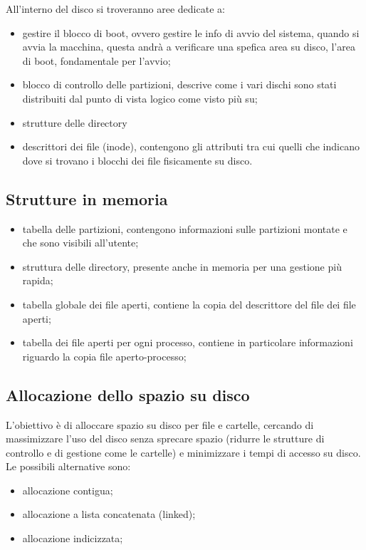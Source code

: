 \documentclass[a4paper, 12pt]{book}
\begin{document}
All'interno del disco si troveranno aree dedicate a:
\begin{itemize}
    \item gestire il blocco di boot, ovvero gestire le info 
    di avvio del sistema, quando si avvia la macchina, questa 
    andrà a verificare una spefica area su disco, l'area di boot,
    fondamentale per l'avvio;
    \item blocco di controllo delle partizioni, descrive come i 
    vari dischi sono stati distribuiti dal punto di vista logico
    come visto più su;
    \item strutture delle directory
    \item descrittori dei file (inode), contengono gli attributi 
    tra cui quelli che indicano dove si trovano i blocchi dei file 
    fisicamente su disco.
\end{itemize}

\subsection{Strutture in memoria}

\begin{itemize}
    \item tabella delle partizioni, contengono informazioni 
    sulle partizioni montate e che sono visibili all'utente;
    \item struttura delle directory, presente anche in memoria 
    per una gestione più rapida;
    \item tabella globale dei file aperti, contiene la copia 
    del descrittore del file dei file aperti;
    \item tabella dei file aperti per ogni processo, contiene in particolare 
    informazioni riguardo la copia file aperto-processo; 
\end{itemize}

\subsection{Allocazione dello spazio su disco}

L'obiettivo è di alloccare spazio su disco per file e cartelle, 
cercando di massimizzare l'uso del disco senza sprecare spazio 
(ridurre le strutture di controllo e di gestione come le cartelle)
e minimizzare i tempi di accesso su disco. Le possibili
alternative sono:
\begin{itemize}
    \item allocazione contigua;
    \item allocazione a lista concatenata (linked);
    \item allocazione indicizzata;
\end{itemize}
\end{document}
